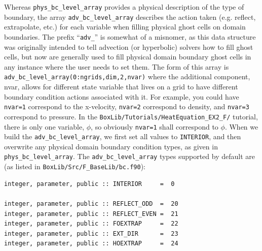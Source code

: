 Whereas {\tt phys\_bc\_level\_array} provides a physical description of the type of boundary, the array
{\tt adv\_bc\_level\_array} describes the action taken (e.g. reflect, extrapolate, etc.) for each 
variable when filling physical ghost cells on domain boundaries.  The prefix ``{\tt adv\_}'' is somewhat
of a misnomer, as this data structure was originally intended to tell advection (or hyperbolic) solvers
how to fill ghost cells, but now are generally used to fill physical domain boundary ghost cells in any
instance where the user needs to set them.
The form of this array is {\tt adv\_bc\_level\_array(0:ngrids,dim,2,nvar)}
where the additional component, nvar, allows for different state variable that lives on a grid to have 
different boundary condition actions associated with it.  For example, you could have {\tt nvar=1}
correspond to the x-velocity, {\tt nvar=2} correspond to density, and {\tt nvar=3} correspond to pressure.
In the {\tt BoxLib/Tutorials/HeatEquation\_EX2\_F/} tutorial, there is only one variable, $\phi$, so
obviously {\tt nvar=1} shall correspond to $\phi$.  When we build the {\tt adv\_bc\_level\_array},
we first set all values to {\tt INTERIOR}, and then overwrite any physical domain boundary condition types,
as given in {\tt phys\_bc\_level\_array}.  The {\tt adv\_bc\_level\_array} types supported by default are
(as listed in {\tt BoxLib/Src/F\_BaseLib/bc.f90}):
\begin{lstlisting}[backgroundcolor=\color{light-green}]
integer, parameter, public :: INTERIOR     =  0

integer, parameter, public :: REFLECT_ODD  =  20
integer, parameter, public :: REFLECT_EVEN =  21
integer, parameter, public :: FOEXTRAP     =  22
integer, parameter, public :: EXT_DIR      =  23
integer, parameter, public :: HOEXTRAP     =  24
\end{lstlisting}

